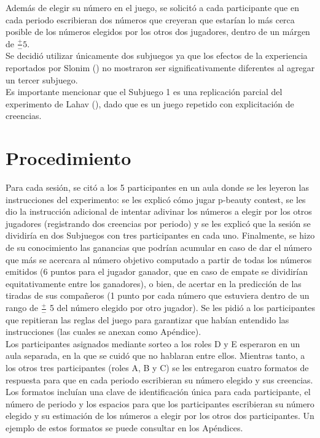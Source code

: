 Además de elegir su número en el juego, se solicitó a cada participante que en cada periodo escribieran dos números que creyeran que estarían lo más cerca posible de los números elegidos por los otros dos jugadores, dentro de un márgen de $\frac{+}{-}5$.\\

Se decidió utilizar únicamente dos subjuegos ya que los efectos de la experiencia reportados por Slonim (\citeyear{Slonim}) no mostraron ser significativamente diferentes al agregar un tercer subjuego.\\

Es importante mencionar que el Subjuego 1 es una replicación parcial del experimento de Lahav (\citeyear{Lahav}), dado que es un juego repetido con explicitación de creencias.\\

\section{Procedimiento}

Para cada sesión, se citó a los 5 participantes en un aula donde se les leyeron las instrucciones del experimento: se les explicó cómo jugar p-beauty contest, se les dio la instrucción adicional de intentar adivinar los números a elegir por los otros jugadores (registrando dos creencias por periodo) y se les explicó que la sesión se dividiría en dos Subjuegos con tres participantes en cada uno. Finalmente, se hizo de su conocimiento las ganancias que podrían acumular en caso de dar el número que más se acercara al número objetivo computado a partir de todas los números emitidos (6 puntos para el jugador ganador, que en caso de empate se dividirían equitativamente entre los ganadores), o bien, de acertar en la predicción de las tiradas de sus compañeros (1 punto por cada número que estuviera dentro de un rango de $\frac{+}{-}$ 5 del número elegido por otro jugador). Se les pidió a los participantes que repitieran las reglas del juego para garantizar que habían entendido las instrucciones (las cuales se anexan como Apéndice).\\

Los participantes asignados mediante sorteo a los roles D y E esperaron en un aula separada, en la que se cuidó que no hablaran entre ellos. Mientras tanto, a los otros tres participantes (roles A, B y C) se les entregaron cuatro formatos de respuesta para que en cada periodo escribieran su número elegido y sus creencias. Los formatos incluían una clave de identificación única para cada participante, el número de periodo y los espacios para que los participantes escribieran su número elegido y su estimación de los números a elegir por los otros dos participantes. Un ejemplo de estos formatos se puede consultar en los Apéndices.\\

